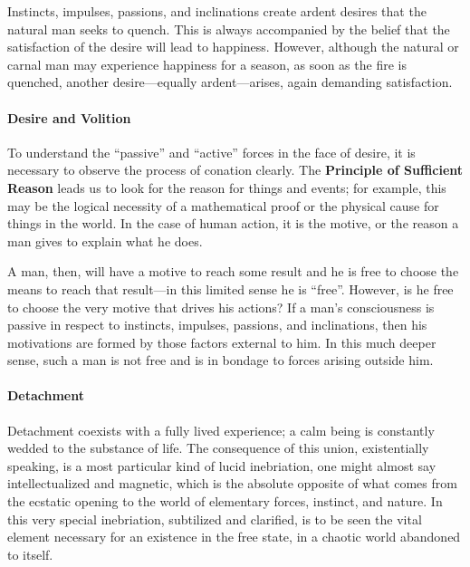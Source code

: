 Instincts, impulses, passions, and inclinations create ardent desires that the natural man seeks to quench. This is always accompanied by the belief that the satisfaction of the desire will lead to happiness. However, although the natural or carnal man may experience happiness for a season, as soon as the fire is quenched, another desire---equally ardent---arises, again demanding satisfaction.

\paragraph{Desire and Volition}


To understand the ``passive'' and ``active'' forces in the face of desire, it is necessary to observe the process of conation clearly. The \textbf{Principle of Sufficient Reason} leads us to look for the reason for things and events; for example, this may be the logical necessity of a mathematical proof or the physical cause for things in the world. In the case of human action, it is the motive, or the reason a man gives to explain what he does.

A man, then, will have a motive to reach some result and he is free to choose the means to reach that result---in this limited sense he is ``free''. However, is he free to choose the very motive that drives his actions? If a man's consciousness is passive in respect to instincts, impulses, passions, and inclinations, then his motivations are formed by those factors external to him. In this much deeper sense, such a man is not free and is in bondage to forces arising outside him.

\paragraph{Detachment}


\begin{quotex}
Detachment coexists with a fully lived experience; a calm being is constantly wedded to the substance of life. The consequence of this union, existentially speaking, is a most particular kind of lucid inebriation, one might almost say intellectualized and magnetic, which is the absolute opposite of what comes from the ecstatic opening to the world of elementary forces, instinct, and nature. In this very special inebriation, subtilized and clarified, is to be seen the vital element necessary for an existence in the free state, in a chaotic world abandoned to itself.
\end{quotex}


